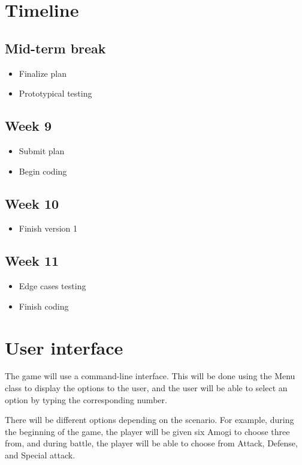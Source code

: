 \documentclass{article}
\begin{document}
  \pagebreak
  
  \section{Timeline}
  
  \subsection*{Mid-term break}
  \begin{itemize}
    \item Finalize plan
    \item Prototypical testing
  \end{itemize}
  
  \subsection*{Week 9}
  \begin{itemize}
    \item Submit plan
    \item Begin coding
  \end{itemize}
  
  \subsection*{Week 10}
  \begin{itemize}
    \item Finish version 1
  \end{itemize}
  
  \subsection*{Week 11}
  \begin{itemize}
    \item Edge cases testing
    \item Finish coding
  \end{itemize}
    
  \setlength{\parindent}{0em}
  \setlength{\parskip}{1em}

  \section{User interface}
  
  The game will use a command-line interface. This will be done using the Menu class to display the options to the user, and the user will be able to select an option by typing the corresponding number. \par 
  There will be different options depending on the scenario. For example, during the beginning of the game, the player will be given six Amogi to choose three from, and during battle, the player will be able to choose from Attack, Defense, and Special attack. 
  
\end{document}
